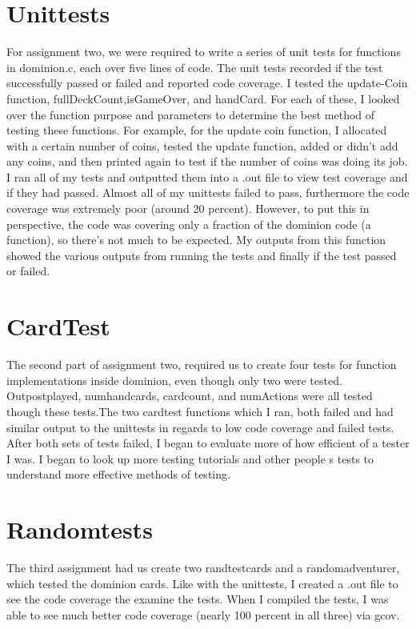 \documentclass[titlepage]{article}
\begin{document}
\section{Unittests}
\begin{singlespace}
	For assignment two, we were required to write a series of unit tests for functions in dominion.c, each over five lines of code. The unit tests recorded if the test successfully passed or failed and reported code coverage. I tested the update-Coin function, fullDeckCount,isGameOver, and handCard. For each of these, I looked over the function purpose and parameters to determine the best method of testing these functions. For example, for the update coin function, I allocated with a certain number of coins, tested the update function, added or didn’t add any coins, and then printed again to test if the number of coins was doing its job. I ran all of my tests and outputted them into a .out file to view test coverage and if they had passed.  Almost all of my unittests failed to pass, furthermore the code coverage was extremely poor (around 20 percent). However, to put this in perspective, the code was covering only a fraction of the dominion code (a function), so there’s not much to be expected. My outputs from this function showed the various outputs from running the tests and finally if the test passed or failed.
\end{singlespace}

\section{CardTest}
\begin{singlespace}
The second part of assignment two, required us to create four tests for function implementations inside dominion, even though only two were tested. Outpostplayed, numhandcards, cardcount, and numActions were all tested though these tests.The two cardtest functions which I ran, both failed and had similar output to the unittests in regards to low code coverage and failed tests. After both sets of tests failed, I began to evaluate more of how efficient of a tester I was. I began to look up more testing tutorials and other people
s tests to understand more effective methods of testing.
\end{singlespace}

\section{Randomtests} 
\begin{singlespace}
	The third assignment had us create two randtestcards and a randomadventurer, which tested the dominion cards.  Like with the unittests, I created a .out file to see the code coverage the examine the tests. When I compiled the tests, I was able to see much better code coverage (nearly 100 percent in all three) via gcov. 
\end{singlespace}
\end{document}
